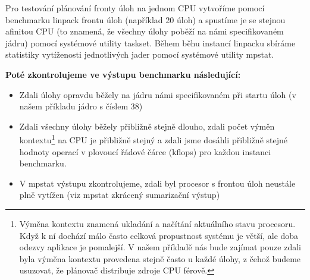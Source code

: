 \documentclass[
  master=true,
  font=sans,
  printversion=false,
  joinlists=true,
  figures=true,
  tables=true,
  sourcecodes=false,
  theorems=false,
  bibencoding=utf8,
  language=czech,
  encoding=utf8,
  field=ainfk,
  biblatex,
  glossaries,
  index
]{kidiplom}
\begin{document}
\label{testovani na jednom jadru}
Pro testování plánování fronty úloh na jednom CPU vytvoříme pomocí benchmarku linpack frontu úloh (například 20 úloh) a spustíme je se stejnou afinitou CPU (to znamená, že všechny úlohy poběží na námi specifikovaném jádru) pomocí systémové utility taskset. Během běhu instancí linpacku sbíráme statistiky vytíženosti jednotlivých jader pomocí systémové utility mpstat.\newline

\noindent
\textbf{Poté zkontrolujeme ve výstupu benchmarku následující:}
\begin{itemize}
\item Zdali úlohy opravdu běžely na jádru námi specifikovaném při startu úloh (v našem příkladu jádro s číslem 38)
\item Zdali všechny úlohy běžely přibližně stejně dlouho, zdali počet výměn kontextu\footnote{Výměna kontextu znamená ukladání a načítání aktuálního stavu procesoru. Když k ní dochází málo často celková propustnost systému je větší, ale doba odezvy aplikace je pomalejší. V našem příkladě nás bude zajímat pouze zdali byla výměna kontextu provedena stejně často u každé úlohy, z čehož budeme usuzovat, že plánovač distribuje zdroje CPU férově.} na CPU je přibližně stejný  a zdali jsme dosáhli přibližně stejné hodnoty operací v plovoucí řádové čárce (kflops) pro každou instanci benchmarku.
\item V mpstat výstupu zkontrolujeme, zdali byl procesor s frontou úloh neustále plně vytížen (viz mpstat zkrácený sumarizační výstup)\\
\end{itemize}

\end{document}
